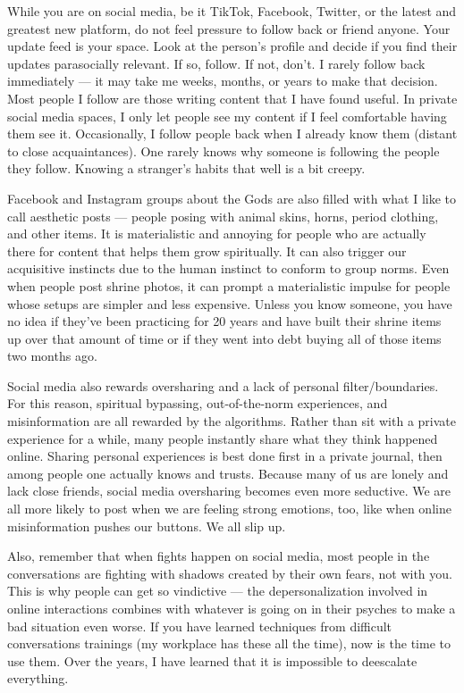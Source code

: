 \documentclass[
]{book}
\begin{document}
While you are on social media, be it TikTok, Facebook, Twitter, or the latest and greatest new platform, do not feel pressure to follow back or friend anyone. Your update feed is your space. Look at the person's profile and decide if you find their updates parasocially relevant. If so, follow. If not, don't. I rarely follow back immediately --- it may take me weeks, months, or years to make that decision. Most people I follow are those writing content that I have found useful. In private social media spaces, I only let people see my content if I feel comfortable having them see it. Occasionally, I follow people back when I already know them (distant to close acquaintances). One rarely knows why someone is following the people they follow. Knowing a stranger's habits that well is a bit creepy.

Facebook and Instagram groups about the Gods are also filled with what I like to call aesthetic posts --- people posing with animal skins, horns, period clothing, and other items. It is materialistic and annoying for people who are actually there for content that helps them grow spiritually. It can also trigger our acquisitive instincts due to the human instinct to conform to group norms. Even when people post shrine photos, it can prompt a materialistic impulse for people whose setups are simpler and less expensive. Unless you know someone, you have no idea if they've been practicing for 20 years and have built their shrine items up over that amount of time or if they went into debt buying all of those items two months ago.

Social media also rewards oversharing and a lack of personal filter/boundaries. For this reason, spiritual bypassing, out-of-the-norm experiences, and misinformation are all rewarded by the algorithms. Rather than sit with a private experience for a while, many people instantly share what they think happened online. Sharing personal experiences is best done first in a private journal, then among people one actually knows and trusts. Because many of us are lonely and lack close friends, social media oversharing becomes even more seductive. We are all more likely to post when we are feeling strong emotions, too, like when online misinformation pushes our buttons. We all slip up.

Also, remember that when fights happen on social media, most people in the conversations are fighting with shadows created by their own fears, not with you. This is why people can get so vindictive --- the depersonalization involved in online interactions combines with whatever is going on in their psyches to make a bad situation even worse. If you have learned techniques from difficult conversations trainings (my workplace has these all the time), now is the time to use them. Over the years, I have learned that it is impossible to deescalate everything.
\end{document}
